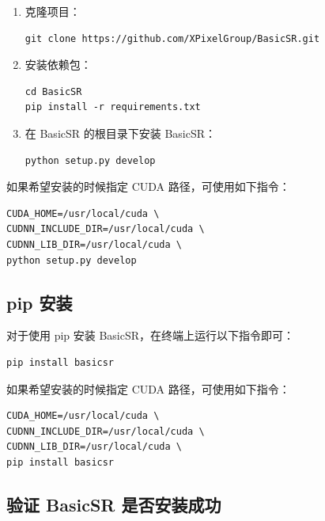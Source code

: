 \documentclass[../main.tex]{subfiles}
\begin{document}
\begin{enumerate}
    \item 克隆项目：
          \begin{verbatim}
git clone https://github.com/XPixelGroup/BasicSR.git
    \end{verbatim}

    \item 安装依赖包：
          \begin{verbatim}
cd BasicSR
pip install -r requirements.txt
    \end{verbatim}

    \item 在 BasicSR 的根目录下安装 BasicSR：
          \begin{verbatim}
python setup.py develop
    \end{verbatim}
\end{enumerate}

如果希望安装的时候指定 CUDA 路径，可使用如下指令：

\begin{verbatim}
CUDA_HOME=/usr/local/cuda \
CUDNN_INCLUDE_DIR=/usr/local/cuda \
CUDNN_LIB_DIR=/usr/local/cuda \
python setup.py develop
\end{verbatim}

\subsection{pip 安装}\label{installation:pip-install}

对于使用 pip 安装 BasicSR，在终端上运行以下指令即可：
\begin{verbatim}
pip install basicsr
    \end{verbatim}

如果希望安装的时候指定 CUDA 路径，可使用如下指令：

\begin{verbatim}
CUDA_HOME=/usr/local/cuda \
CUDNN_INCLUDE_DIR=/usr/local/cuda \
CUDNN_LIB_DIR=/usr/local/cuda \
pip install basicsr
\end{verbatim}

\subsection{验证 BasicSR 是否安装成功}\label{installation:verify-installation}
\end{document}

